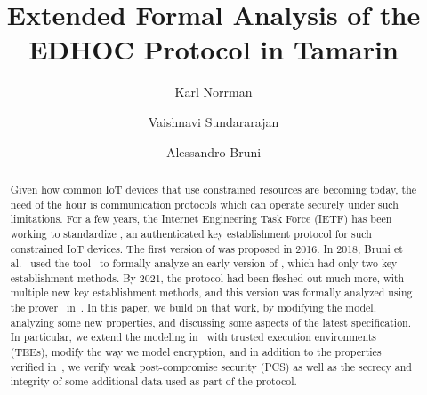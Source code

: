 \documentclass[runningheads]{llncs}
\begin{document}
\title{Extended Formal Analysis of the EDHOC Protocol in Tamarin}
\author{
    Karl Norrman \and
    Vaishnavi Sundararajan \and
    Alessandro Bruni
}

\maketitle
%

\begin{abstract}
Given how common IoT devices that use constrained resources are becoming
today, the need of the hour is communication protocols which can operate
securely under such limitations.
%
For a few years, the Internet Engineering Task Force (IETF) has been working
to standardize \mEdhoc{}, an authenticated key establishment protocol for
such constrained IoT devices.
%
The first version of \mEdhoc{} was proposed in 2016.
%
In 2018, Bruni et al.~\cite{DBLP:conf/secsr/BruniJPS18} used the \mProverif{}
tool~\cite{DBLP:conf/csfw/Blanchet01} to formally analyze an early version of
\mEdhoc{}, which had only two key establishment methods.
%
By 2021, the protocol had been fleshed out much more, with multiple new key
establishment methods, and this version was formally analyzed using the
\mTamarin{} prover~\cite{DBLP:conf/cav/MeierSCB13} in~\cite{Norr21}.
%
In this paper, we build on that work, by modifying the model, analyzing some new properties, and discussing some aspects of the latest \mEdhoc{}
specification. In particular, we extend the modeling in~\cite{Norr21} with trusted execution environments (TEEs), modify the way we model \mXor{} encryption, and in addition to the properties verified in~\cite{Norr21}, we verify weak post-compromise security (PCS) as well as the secrecy and integrity of some additional data used as part of the protocol.


\end{abstract}
%
\end{document}
